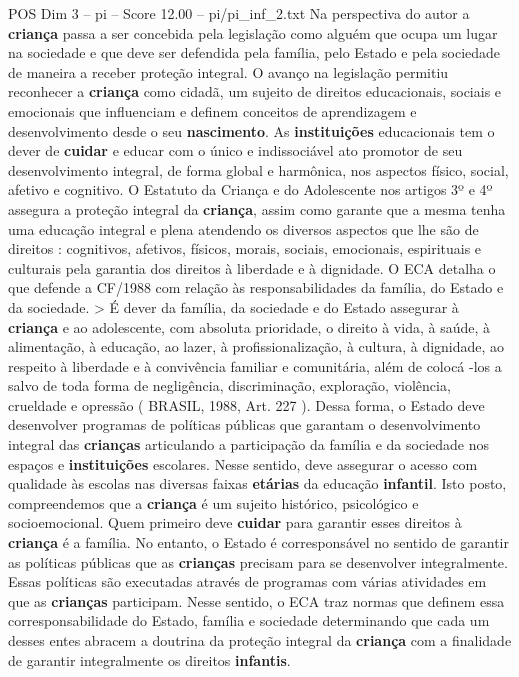 \begin{textsample}{POS Dim 3 – pi – Score 12.00 – pi/pi\_inf\_2.txt}
Na perspectiva do autor a \textbf{criança} passa a ser concebida pela legislação como alguém que ocupa um lugar na sociedade e que deve ser defendida pela família, pelo Estado e pela sociedade de maneira a receber proteção integral.
O avanço na legislação permitiu reconhecer a \textbf{criança} como cidadã, um sujeito de direitos educacionais, sociais e emocionais que influenciam e definem conceitos de aprendizagem e desenvolvimento desde o seu \textbf{nascimento}.
As \textbf{instituições} educacionais tem o dever de \textbf{cuidar} e educar com o único e indissociável ato promotor de seu desenvolvimento integral, de forma global e harmônica, nos aspectos físico, social, afetivo e cognitivo.
O Estatuto da Criança e do Adolescente nos artigos 3º e 4º assegura a proteção integral da \textbf{criança}, assim como garante que a mesma tenha uma educação integral e plena atendendo os diversos aspectos que lhe são de direitos : cognitivos, afetivos, físicos, morais, sociais, emocionais, espirituais e culturais pela garantia dos direitos à liberdade e à dignidade.
O ECA detalha o que defende a CF/1988 com relação às responsabilidades da família, do Estado e da sociedade. > É dever da família, da sociedade e do Estado assegurar à \textbf{criança} e ao adolescente, com absoluta prioridade, o direito à vida, à saúde, à alimentação, à educação, ao lazer, à profissionalização, à cultura, à dignidade, ao respeito à liberdade e à convivência familiar e comunitária, além de colocá -los a salvo de toda forma de negligência, discriminação, exploração, violência, crueldade e opressão ( BRASIL, 1988, Art. 227 ).
Dessa forma, o Estado deve desenvolver programas de políticas públicas que garantam o desenvolvimento integral das \textbf{crianças} articulando a participação da família e da sociedade nos espaços e \textbf{instituições} escolares.
Nesse sentido, deve assegurar o acesso com qualidade às escolas nas diversas faixas \textbf{etárias} da educação \textbf{infantil}.
Isto posto, compreendemos que a \textbf{criança} é um sujeito histórico, psicológico e socioemocional.
Quem primeiro deve \textbf{cuidar} para garantir esses direitos à \textbf{criança} é a família.
No entanto, o Estado é corresponsável no sentido de garantir as políticas públicas que as \textbf{crianças} precisam para se desenvolver integralmente.
Essas políticas são executadas através de programas com várias atividades em que as \textbf{crianças} participam.
Nesse sentido, o ECA traz normas que definem essa corresponsabilidade do Estado, família e sociedade determinando que cada um desses entes abracem a doutrina da proteção integral da \textbf{criança} com a finalidade de garantir integralmente os direitos \textbf{infantis}.

\end{textsample}
